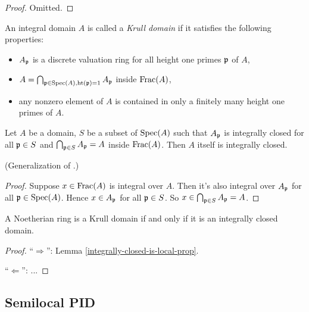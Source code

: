 \begin{proof}
\leanok
Omitted.
\end{proof}

\begin{definition}
\label{krull-domain-defn}
\leanok
An integral domain $A$ is called a \emph{Krull domain}
if it satisfies the following properties:
\begin{itemize}
\item
$A_{\mathfrak{p}}$ is a discrete valuation ring for all height one primes ${\mathfrak{p}}$ of $A$,
\item
$A=\bigcap_{{\mathfrak{p}}\in{\mathrm{Spec}}(A),{\mathrm{ht}}({\mathfrak{p}})=1}A_{\mathfrak{p}}$ inside ${\mathrm{Frac}}(A)$,
\item
any nonzero element of $A$ is contained in only a finitely many height one primes of $A$.
\end{itemize}
\end{definition}


\begin{lem}
\label{integrally-closed-is-local-prop}
Let $A$ be a domain, $S$ be a subset of ${\mathrm{Spec}}(A)$
such that $A_{\mathfrak{p}}$ is integrally closed for all ${\mathfrak{p}}\in S$
and $\bigcap_{{\mathfrak{p}}\in S}A_{\mathfrak{p}}=A$ inside ${\mathrm{Frac}}(A)$.
Then $A$ itself is integrally closed.

(Generalization of .)
\end{lem}

\begin{proof}
Suppose $x\in{\mathrm{Frac}}(A)$ is integral over $A$. Then it's also integral over $A_{\mathfrak{p}}$
for all ${\mathfrak{p}}\in{\mathrm{Spec}}(A)$. Hence $x\in A_{\mathfrak{p}}$ for all ${\mathfrak{p}}\in S$.
So $x\in\bigcap_{{\mathfrak{p}}\in S}A_{\mathfrak{p}}=A$.
\end{proof}

\begin{prop}
\label{noeth-ring-is-krull-domain-iff}
\leanok
{}
A Noetherian ring is a Krull domain if and only if it is an integrally closed domain.
\end{prop}

\begin{proof}
``$\Rightarrow$'': Lemma \ref{integrally-closed-is-local-prop}.

``$\Leftarrow$'': ...
\end{proof}

\subsection{Semilocal PID}

